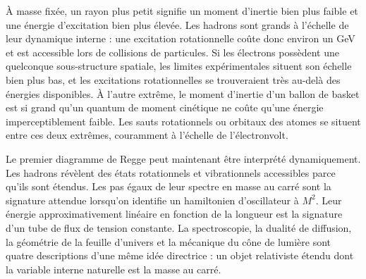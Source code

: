 À masse fixée, un rayon plus petit signifie un moment d’inertie bien plus faible et une énergie d’excitation bien plus élevée. Les hadrons sont grands à l’échelle de leur dynamique interne : une excitation rotationnelle coûte donc environ un GeV et est accessible lors de collisions de particules. Si les électrons possèdent une quelconque sous-structure spatiale, les limites expérimentales situent son échelle bien plus bas, et les excitations rotationnelles se trouveraient très au-delà des énergies disponibles. À l’autre extrême, le moment d’inertie d’un ballon de basket est si grand qu’un quantum de moment cinétique ne coûte qu’une énergie imperceptiblement faible. Les sauts rotationnels ou orbitaux des atomes se situent entre ces deux extrêmes, couramment à l’échelle de l’électronvolt.

\begin{classroomqa}
\end{classroomqa}

Le premier diagramme de Regge peut maintenant être interprété dynamiquement. Les hadrons révèlent des états rotationnels et vibrationnels accessibles parce qu’ils sont étendus. Les pas égaux de leur spectre en masse au carré sont la signature attendue lorsqu’on identifie un hamiltonien d’oscillateur à \(M^2\). Leur énergie approximativement linéaire en fonction de la longueur est la signature d’un tube de flux de tension constante. La spectroscopie, la dualité de diffusion, la géométrie de la feuille d’univers et la mécanique du cône de lumière sont quatre descriptions d’une même idée directrice : un objet relativiste étendu dont la variable interne naturelle est la masse au carré.
